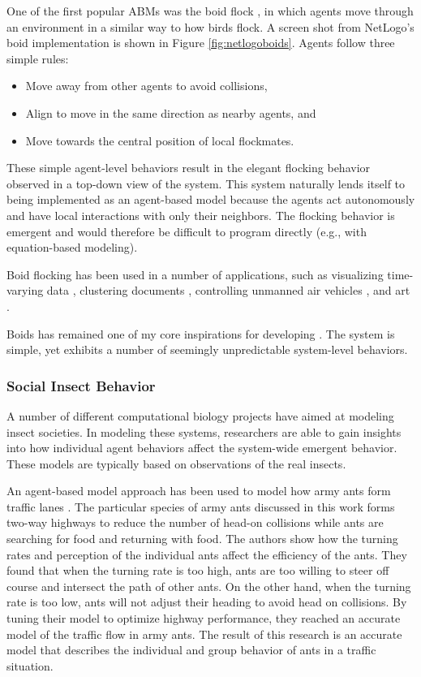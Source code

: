 One of the first popular ABMs was the boid flock \cite{reynolds1987,reynolds1999sba}, in which agents move through an environment in a similar way to how birds flock.
A screen shot from NetLogo's boid implementation \cite{flocking} is shown in Figure \ref{fig:netlogoboids}.
Agents follow three simple rules:
   \begin{itemize}
      \item Move away from other agents to avoid collisions,
      \item Align to move in the same direction as nearby agents, and
      \item Move towards the central position of local flockmates.
   \end{itemize}
These simple agent-level behaviors result in the elegant flocking behavior observed in a top-down view of the system.
This system naturally lends itself to being implemented as an agent-based model because the agents act autonomously and have local interactions with only their neighbors.
The flocking behavior is emergent and would therefore be difficult to program directly (e.g., with equation-based modeling).

Boid flocking has been used in a number of applications, such as visualizing time-varying data \cite{1382896}, clustering documents \cite{cui2006flocking}, controlling unmanned air vehicles \cite{crowther2003flocking}, and art \cite{Boyd}.

Boids has remained one of my core inspirations for developing \fw.
The system is simple, yet exhibits a number of seemingly unpredictable system-level behaviors.

\subsubsection{Social Insect Behavior}

A number of different computational biology projects have aimed at modeling insect societies.
In modeling these systems, researchers are able to gain insights into how individual agent behaviors affect the system-wide emergent behavior.
These models are typically based on observations of the real insects.

An agent-based model approach has been used to model how army ants form traffic lanes \cite{couzin2003sol}.
The particular species of army ants discussed in this work forms two-way highways to reduce the number of head-on collisions while ants are searching for food and returning with food.
The authors show how the turning rates and perception of the individual ants affect the efficiency of the ants.
They found that when the turning rate is too high, ants are too willing to steer off course and intersect the path of other ants.
On the other hand, when the turning rate is too low, ants will not adjust their heading to avoid head on collisions.
By tuning their model to optimize highway performance, they reached an accurate model of the traffic flow in army ants.
The result of this research is an accurate model that describes the individual and group behavior of ants in a traffic situation.

